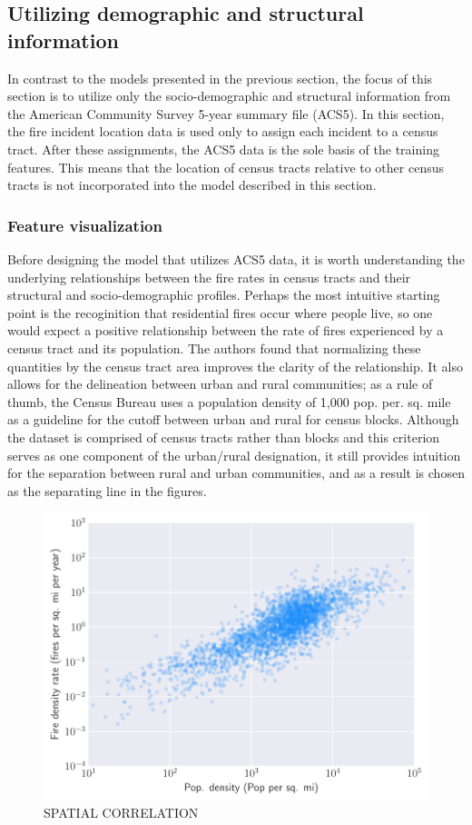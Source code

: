 \documentclass{svjour3}
\begin{document}
  
  

  \subsection{Utilizing demographic and structural information}
  In contrast to the models presented in the previous section, the focus of this section is to utilize only the socio-demographic and structural information from the American Community Survey 5-year summary file (ACS5). In this section, the fire incident location data is used only to assign each incident to a census tract. After these assignments, the ACS5 data is the sole basis of the training features. This means that the location of census tracts relative to other census tracts is not incorporated into the model described in this section.

  \subsubsection{Feature visualization}
  Before designing the model that utilizes ACS5 data, it is worth understanding the underlying relationships between the fire rates in census tracts and their structural and socio-demographic profiles. Perhaps the most intuitive starting point is the recoginition that residential fires occur where people live, so one would expect a positive relationship between the rate of fires experienced by a census tract and its population. The authors found that normalizing these quantities by the census tract area improves the clarity of the relationship. It also allows for the delineation between urban and rural communities; as a rule of thumb, the Census Bureau   \cite{ratcliffe2016defining} uses a population density of 1,000 pop. per. sq. mile as a guideline for the cutoff between urban and rural for census blocks. Although the dataset is comprised of census tracts rather than blocks and this criterion serves as one component of the urban/rural designation, it still provides intuition for the separation between rural and urban communities, and as a result is chosen as the separating line in the figures. 
  
  
  
 \begin{figure}[htb] \centering
\includegraphics[width=.5\textwidth]{figures/pop_relation.pdf}
\caption{SPATIAL CORRELATION}
\label{fig:pop_relation}
\end{figure}
  
\end{document}
